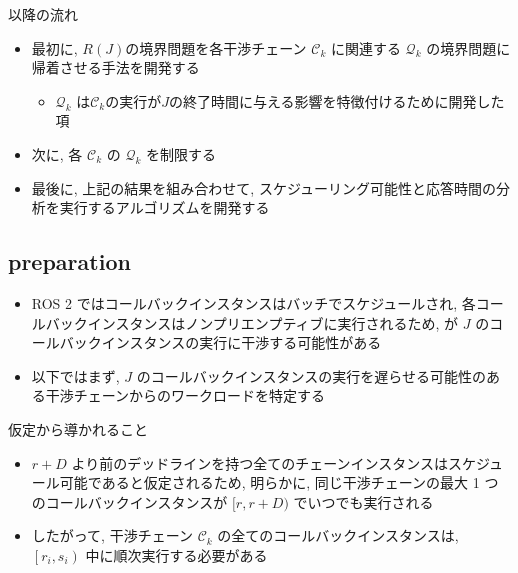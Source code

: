 \begin{frame}{以降の流れ}
    \begin{itemize}
        \item 最初に, $R(J)$の境界問題を各干渉チェーン $\mathcal{C}_{k}$ に関連する $\mathcal{Q}_{k}$ の境界問題に帰着させる手法を開発する
              \begin{itemize}
                  \item $\mathcal{Q}_{k}$ は$\mathcal{C}_{k}$の実行が$J$の終了時間に与える影響を特徴付けるために開発した項
              \end{itemize}
        \item 次に, 各 $\mathcal{C}_{k}$ の $\mathcal{Q}_{k}$ を制限する
        \item 最後に, 上記の結果を組み合わせて, スケジューリング可能性と応答時間の分析を実行するアルゴリズムを開発する
    \end{itemize}
\end{frame}


\subsection{preparation}
\label{ssec: preparation}

\begin{frame}{}
    \begin{itemize}
        \item ROS 2 ではコールバックインスタンスはバッチでスケジュールされ, 各コールバックインスタンスはノンプリエンプティブに実行されるため, が $J$ のコールバックインスタンスの実行に干渉する可能性がある
        \item 以下ではまず, $J$ のコールバックインスタンスの実行を遅らせる可能性のある干渉チェーンからのワークロードを特定する
    \end{itemize}
\end{frame}

\begin{frame}{仮定から導かれること}
    \begin{itemize}
        \item  $r+D$ より前のデッドラインを持つ全てのチェーンインスタンスはスケジュール可能であると仮定されるため, 明らかに, 同じ干渉チェーンの最大 1 つのコールバックインスタンスが $[r, r+D)$ でいつでも実行される
        \item したがって, 干渉チェーン $\mathcal{C}_{k}$ の全てのコールバックインスタンスは, $\left[r_{i}, s_{i}\right)$ 中に順次実行する必要がある
    \end{itemize}
\end{frame}

